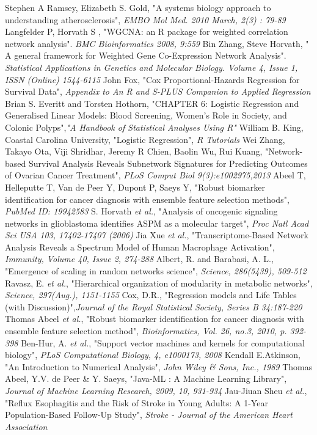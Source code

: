 \documentclass{ba-kecs}
\numberwithin{figure}{section}
\numberwithin{equation}{section}
\begin{document}
\begin{thebibliography}{99}
 Stephen A Ramsey, Elizabeth S. Gold, "A systems biology approach to understanding atherosclerosis", \emph{EMBO Mol Med. 2010 March, 2(3) : 79-89}
 Langfelder P, Horvath S , "WGCNA: an R package for weighted correlation network analysis". \emph{BMC Bioinformatics 2008, 9:559}
 Bin Zhang, Steve Horvath, " A general framework for Weighted Gene Co-Expression Network Analysis". \emph{Statistical Applications in Genetics and Molecular Biology. Volume 4, Issue 1, ISSN (Online) 1544-6115}
 John Fox, "Cox Proportional-Hazards Regression for Survival Data", \emph{Appendix to An R and S-PLUS Companion to Applied Regression}
 Brian S. Everitt and Torsten Hothorn, "CHAPTER 6: Logistic Regression and Generalised Linear Models: Blood Screening, Women’s Role in Society, and Colonic Polyps",\emph{"A Handbook of Statistical Analyses Using R"}
 William B. King, Coastal Carolina University, "Logistic Regression", \emph{R Tutorials} 
 Wei Zhang, Takayo Ota, Viji Shridhar, Jeremy R Chien, Baolin Wu, Rui Kuang, "Network-based Survival Analysis Reveals Subnetwork Signatures for Predicting Outcomes of Ovarian Cancer Treatment", \emph{PLoS Comput Biol 9(3):e1002975,2013}
 Abeel T, Helleputte T, Van de Peer Y, Dupont P, Saeys Y, "Robust biomarker identification for cancer diagnosis with ensemble feature selection methods", \emph{PubMed ID: 19942583}
 S. Horvath \emph{et al.}, "Analysis of oncogenic signaling networks in glioblastoma identifies ASPM as a molecular target", \emph{Proc Natl Acad Sci USA 103, 17402-17407 (2006)}
 Jia Xue \emph{et al.}, "Transcriptome-Based Network Analysis Reveals a Spectrum Model of Human Macrophage Activation", \emph{Immunity, Volume 40, Issue 2, 274-288}
 Albert, R. and Barabasi, A. L., "Emergence of scaling in random networks science", \emph{Science, 286(5439), 509-512}
 Ravasz, E. \emph{et al.}, "Hierarchical organization of modularity in metabolic networks", \emph{Science, 297(Aug.), 1151-1155}
 Cox, D.R., "Regression models and Life Tables (with Discussion)",\emph{Journal of the Royal Statistical Society, Series B 34:187-220}
 Thomas Abeel \emph{et al.}, "Robust biomarker identification for cancer diagnosis with ensemble feature selection method", \emph{Bioinformatics, Vol. 26, no.3, 2010, p. 392-398}
 Ben-Hur, A. \emph{et al.}, "Support vector machines and kernels for computational biology", \emph{PLoS Computational Biology, 4, e1000173, 2008}
 Kendall E.Atkinson, "An Introduction to Numerical Analysis", \emph{John Wiley \& Sons, Inc., 1989}
 Thomas Abeel, Y.V. de Peer \& Y. Saeys, "Java-ML : A Machine Learning Library", \emph{Journal of Machine Learning Research, 2009, 10, 931-934}
 Jau-Jiuan Sheu \emph{et al.}, "Reflux Esophagitis and the Risk of Stroke in Young Adults: A 1-Year Population-Based Follow-Up Study", \emph{Stroke - Journal of the American Heart Association}
\end{thebibliography}
\end{document}
